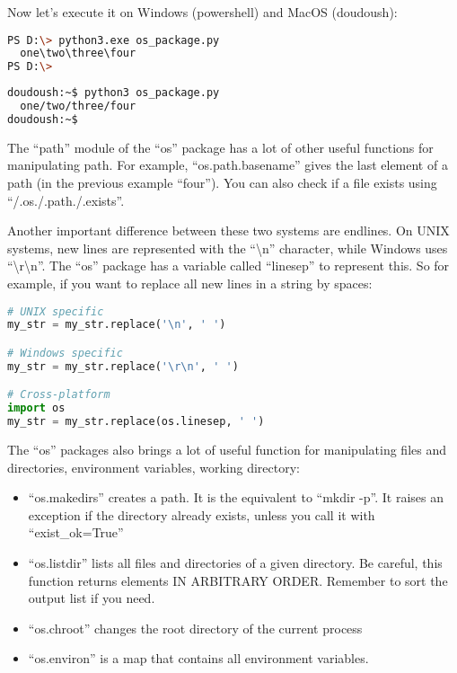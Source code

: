 Now let's execute it on Windows (powershell) and MacOS (doudoush):

\begin{lstlisting}[language=bash]
PS D:\> python3.exe os_package.py
  one\two\three\four
PS D:\>
\end{lstlisting}

\begin{lstlisting}[language=bash]
doudoush:~$ python3 os_package.py
  one/two/three/four
doudoush:~$
\end{lstlisting}

The ``path'' module of the ``os'' package has a lot of other useful functions for
manipulating path. For example, ``os.path.basename'' gives the last element of a path
(in the previous example ``four''). You can also check if a file exists using ``/.os./.path./.exists''.


\vspace{5mm}

Another important difference between these two systems are endlines. On UNIX systems,
new lines are represented with the ``\textbackslash n'' character, while
Windows uses ``\textbackslash r\textbackslash n''.
The ``os'' package has a variable called ``linesep'' to represent this. So for example,
if you want to replace all new lines in a string by spaces:

\begin{lstlisting}[language=python]
# UNIX specific
my_str = my_str.replace('\n', ' ')

# Windows specific
my_str = my_str.replace('\r\n', ' ')

# Cross-platform
import os
my_str = my_str.replace(os.linesep, ' ')
\end{lstlisting}

\vspace{5mm}

The ``os'' packages also brings a lot of useful function for manipulating files
and directories, environment variables, working directory:

\begin{itemize}
\item ``os.makedirs'' creates a path. It is the equivalent to ``mkdir -p''.
  It raises an exception if the directory already exists, unless you call it
  with ``exist\_ok=True''
\item ``os.listdir'' lists all files and directories of a given directory.
  Be careful, this function returns elements IN ARBITRARY ORDER. Remember
  to sort the output list if you need.
\item ``os.chroot'' changes the root directory of the current process
\item ``os.environ'' is a map that contains all environment variables.
\end{itemize}

